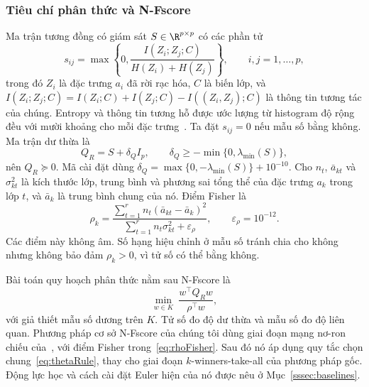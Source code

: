 \subsubsection{Tiêu chí phân thức và N-Fscore}\label{ssec:wang}\label{sssec:wang-inputs}\label{sssec:nfscore}
Ma trận tương đồng có giám sát $S\in\R^{p\times p}$ có các phần tử
\begin{equation}\label{eq:simMI}
s_{ij}=\max\left\{0,\frac{I(Z_i;Z_j;C)}{H(Z_i)+H(Z_j)}\right\},\qquad i,j=1,\ldots,p,
\end{equation}
trong đó $Z_i$ là đặc trưng $a_i$ đã rời rạc hóa, $C$ là biến lớp, và $I(Z_i;Z_j;C)=I(Z_i;C)+I(Z_j;C)-I((Z_i,Z_j);C)$ là thông tin tương tác của chúng. Entropy và thông tin tương hỗ được ước lượng từ histogram độ rộng đều với mười khoảng cho mỗi đặc trưng~\citep{brown2012}. Ta đặt $s_{ij}=0$ nếu mẫu số bằng không. Ma trận dư thừa là
\begin{equation}\label{eq:matrixQ}
Q_R=S+\delta_QI_p,\qquad \delta_Q\ge-\min\{0,\lambda_{\min}(S)\},
\end{equation}
nên $Q_R\succeq0$. Mã cài đặt dùng $\delta_Q=\max\{0,-\lambda_{\min}(S)\}+10^{-10}$. Cho $n_t$, $\bar a_{kt}$ và $\sigma_{kt}^2$ là kích thước lớp, trung bình và phương sai tổng thể của đặc trưng $a_k$ trong lớp $t$, và $\bar a_k$ là trung bình chung của nó. Điểm Fisher là
\begin{equation}\label{eq:rhoFisher}
\rho_k=\frac{\sum_{t=1}^r n_t(\bar a_{kt}-\bar a_k)^2}{\sum_{t=1}^r n_t\sigma_{kt}^2+\varepsilon_\rho},\qquad \varepsilon_\rho=10^{-12}.
\end{equation}
Các điểm này không âm. Số hạng hiệu chỉnh ở mẫu số tránh chia cho không nhưng không bảo đảm $\rho_k>0$, vì tử số có thể bằng không.

Bài toán quy hoạch phân thức nằm sau N-Fscore là
\begin{equation}\label{eq:wangOrig}
\min_{w\in K}\ \frac{w^{\top}Q_Rw}{\rho^{\top}w},
\end{equation}
với giả thiết mẫu số dương trên $K$. Tử số đo độ dư thừa và mẫu số đo độ liên quan. Phương pháp cơ sở N-Fscore của chúng tôi dùng giai đoạn mạng nơ-ron chiếu của~\citep{wang2021fractional}, với điểm Fisher trong~\eqref{eq:rhoFisher}. Sau đó nó áp dụng quy tắc chọn chung~\eqref{eq:thetaRule}, thay cho giai đoạn $k$-winners-take-all của phương pháp gốc. Động lực học và cách cài đặt Euler hiện của nó được nêu ở Mục~\ref{sssec:baselines}.

